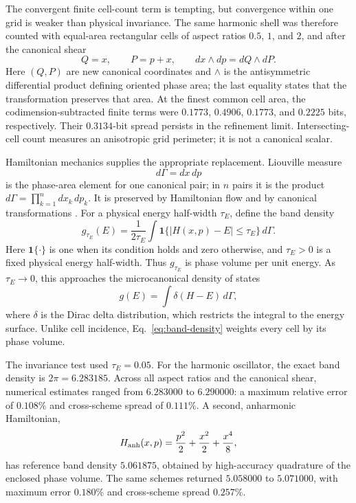 \documentclass[10pt]{article}
\begin{document}
The convergent finite cell-count term is tempting, but convergence within one
grid is weaker than physical invariance.  The same harmonic shell was therefore
counted with equal-area rectangular cells of aspect ratios $0.5$, $1$, and $2$,
and after the canonical shear
\begin{equation}
Q=x,
\qquad P=p+x,
\qquad dx\wedge dp=dQ\wedge dP.
\label{eq:canonical-shear}
\end{equation}
Here $(Q,P)$ are new canonical coordinates and $\wedge$ is the antisymmetric
differential product defining oriented phase area; the last equality states
that the transformation preserves that area.  At the finest common cell area,
the codimension-subtracted finite terms were
$0.1773$, $0.4906$, $0.1773$, and $0.2225$ bits, respectively.  Their
$0.3134$-bit spread persists in the refinement limit.  Intersecting-cell count
measures an anisotropic grid perimeter; it is not a canonical scalar.

Hamiltonian mechanics supplies the appropriate replacement.  Liouville
measure
\begin{equation}
d\Gamma=dx\,dp
\label{eq:liouville-measure}
\end{equation}
is the phase-area element for one canonical pair; in $n$ pairs it is the
product $d\Gamma=\prod_{k=1}^n dx_k\,dp_k$.  It is preserved by Hamiltonian
flow and by canonical transformations
\citep{Liouville1838,Arnold1989}.  For a physical energy half-width $\tau_E$,
define the band density
\begin{equation}
g_{\tau_E}(E)
=\frac{1}{2\tau_E}
\int\mathbf1\{|H(x,p)-E|\le\tau_E\}\,d\Gamma.
\label{eq:band-density}
\end{equation}
Here $\mathbf1\{\cdot\}$ is one when its condition holds and zero otherwise,
and $\tau_E>0$ is a fixed physical energy half-width.  Thus $g_{\tau_E}$ is
phase volume per unit energy.  As $\tau_E\to0$, this approaches the
microcanonical density of states
\begin{equation}
g(E)=\int\delta(H-E)\,d\Gamma,
\label{eq:density-of-states}
\end{equation}
where $\delta$ is the Dirac delta distribution, which restricts the integral
to the energy surface.  Unlike cell incidence, Eq.~\eqref{eq:band-density}
weights every cell by its phase volume.

The invariance test used $\tau_E=0.05$.  For the harmonic oscillator, the exact
band density is $2\pi=6.283185$.  Across all aspect ratios and the canonical
shear, numerical estimates ranged from $6.283000$ to $6.290000$: a maximum
relative error of $0.108\%$ and cross-scheme spread of $0.111\%$.  A second,
anharmonic Hamiltonian,
\begin{equation}
H_{\rm anh}(x,p)=\frac{p^2}{2}+\frac{x^2}{2}+\frac{x^4}{8},
\label{eq:anharmonic}
\end{equation}
has reference band density $5.061875$, obtained by high-accuracy quadrature of
the enclosed phase volume.  The same schemes returned $5.058000$ to
$5.071000$, with maximum error $0.180\%$ and cross-scheme spread $0.257\%$.
\end{document}

